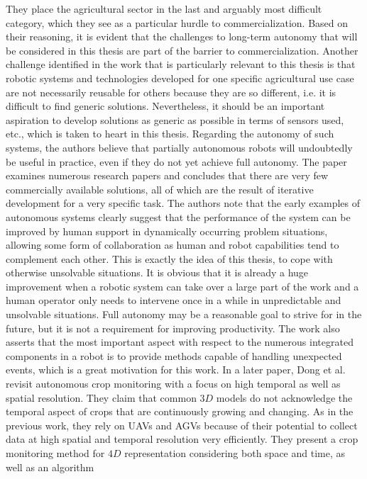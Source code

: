 \documentclass[english, master, utf8]{base/thesis_KBS}
\begin{document}
They place the agricultural sector in the last and arguably most difficult category, which they see as a particular hurdle to commercialization. Based on their reasoning, it is
evident that the challenges to long-term autonomy that will be considered in this thesis are part of the barrier to commercialization. Another challenge identified in the work that
is particularly relevant to this thesis is that robotic systems and technologies developed for one specific agricultural use case are not necessarily reusable for others because they
are so different, i.e. it is difficult to find generic solutions. Nevertheless, it should be an important aspiration to develop solutions as generic as possible in terms of sensors
used, etc., which is taken to heart in this thesis. Regarding the autonomy of such systems, the authors believe that partially autonomous robots will undoubtedly be useful in
practice, even if they do not yet achieve full autonomy. The paper examines numerous research papers and concludes that there are very few commercially available solutions, all of
which are the result of iterative development for a very specific task. The authors note that the early examples of autonomous systems clearly suggest that the performance of the
system can be improved by human support in dynamically occurring problem situations, allowing some form of collaboration as human and robot capabilities tend to complement each
other. This is exactly the idea of this thesis, to cope with otherwise unsolvable situations. It is obvious that it is already a huge improvement when a robotic system can take over
a large part of the work and a human operator only needs to intervene once in a while in unpredictable and unsolvable situations. Full autonomy may be a reasonable goal to strive for
in the future, but it is not a requirement for improving productivity. The work also asserts that the most important aspect with respect to the numerous integrated components in a
robot is to provide methods capable of handling unexpected events, which is a great motivation for this work.\newline
In a later paper, Dong et al. \cite{Dong:2017} revisit autonomous crop monitoring with a focus on high temporal as well as spatial resolution. They claim that common $3D$ models do
not acknowledge the temporal aspect of crops that are continuously growing and changing. As in the previous work, they rely on UAVs and AGVs because of their potential to collect
data at high spatial and temporal resolution very efficiently. They present a crop monitoring method for $4D$ representation considering both space and time, as well as an algorithm
\end{document}
